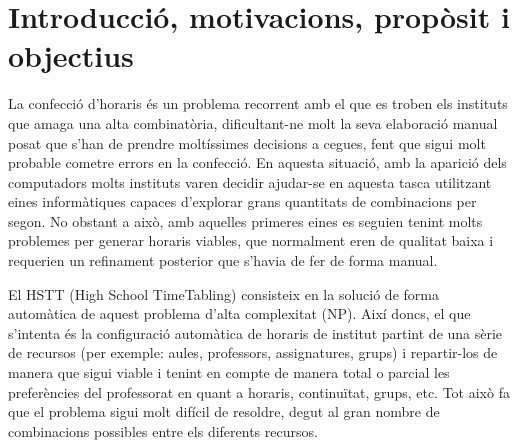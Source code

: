 \documentclass[11pt,a4paper,twoside]{report}
\begin{document}
  \begin{titlepage}
    
  \end{titlepage}


  \shipout\null
  \tableofcontents
  
  \chapter{Introducció, motivacions, propòsit i objectius}
  

  La confecció d'horaris és un problema recorrent amb el que es troben els instituts que amaga una alta combinatòria, dificultant-ne molt la seva elaboració manual posat que s'han de prendre moltíssimes decisions a cegues,
  fent que sigui molt probable cometre errors en la confecció. En aquesta situació, amb la aparició dels computadors molts instituts varen decidir ajudar-se en aquesta tasca utilitzant eines informàtiques capaces 
  d'explorar grans quantitats de combinacions per segon. No obstant a això, amb aquelles primeres eines es seguien tenint molts problemes per generar horaris viables, que normalment eren de qualitat baixa 
  i requerien un refinament posterior que s'havia de fer de forma manual.
  
  El HSTT (High School TimeTabling) consisteix en la solució de forma automàtica de aquest problema d'alta complexitat (NP). 
  Així doncs, el que s'intenta és la configuració automàtica de horaris de institut partint de una sèrie de recursos 
  (per exemple: aules, professors, assignatures, grups) i repartir-los de manera que sigui viable i tenint en compte 
  de manera total o parcial les preferències del professorat en quant a horaris, continuïtat, grups, etc. Tot això fa que el problema sigui molt difícil de resoldre, degut al gran nombre de combinacions possibles entre els diferents recursos.
  
\end{document}
